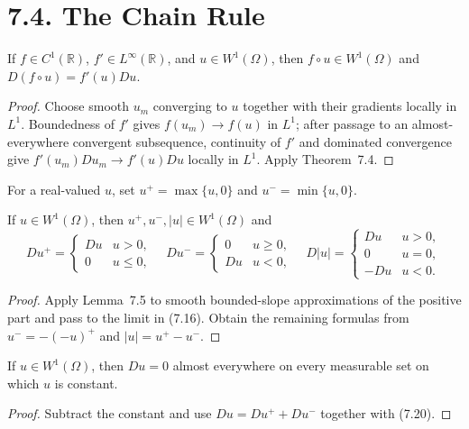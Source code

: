 \section*{7.4. The Chain Rule}

\begin{lemma}
\label{gt:lem-sobolev-chain-rule-c1}
If $f\in C^1(\mathbb R)$, $f'\in L^\infty(\mathbb R)$, and
$u\in W^1(\Omega)$, then $f\circ u\in W^1(\Omega)$ and
$D(f\circ u)=f'(u)Du$.
\end{lemma}
\begin{proof}
\sketch Choose smooth $u_m$ converging to $u$ together with their gradients
locally in $L^1$. Boundedness of $f'$ gives $f(u_m)\to f(u)$ in $L^1$;
after passage to an almost-everywhere convergent subsequence, continuity of
$f'$ and dominated convergence give $f'(u_m)Du_m\to f'(u)Du$ locally in
$L^1$. Apply Theorem~7.4.
\end{proof}

For a real-valued $u$, set $u^+=\max\{u,0\}$ and
$u^-=\min\{u,0\}$.

\begin{lemma}
\label{gt:lem-sobolev-positive-negative-parts}
If $u\in W^1(\Omega)$, then $u^+,u^-,|u|\in W^1(\Omega)$ and
\begin{equation}
\tag{7.20}
Du^+=\begin{cases}Du&u>0,\\0&u\leq0,
\end{cases}
\quad
Du^-=\begin{cases}0&u\geq0,\\Du&u<0,
\end{cases}
\quad
D|u|=\begin{cases}Du&u>0,\\0&u=0,\\-Du&u<0.
\end{cases}
\end{equation}
\end{lemma}
\begin{proof}
\sketch Apply Lemma~7.5 to smooth bounded-slope approximations of the positive
part and pass to the limit in (7.16). Obtain the remaining formulas from
$u^-=-(-u)^+$ and $|u|=u^+-u^-$.
\end{proof}

\begin{lemma}
\label{gt:lem-sobolev-constant-gradient-zero}
If $u\in W^1(\Omega)$, then $Du=0$ almost everywhere on every measurable set
on which $u$ is constant.
\end{lemma}
\begin{proof}
\sketch Subtract the constant and use $Du=Du^++Du^-$ together with (7.20).
\end{proof}

